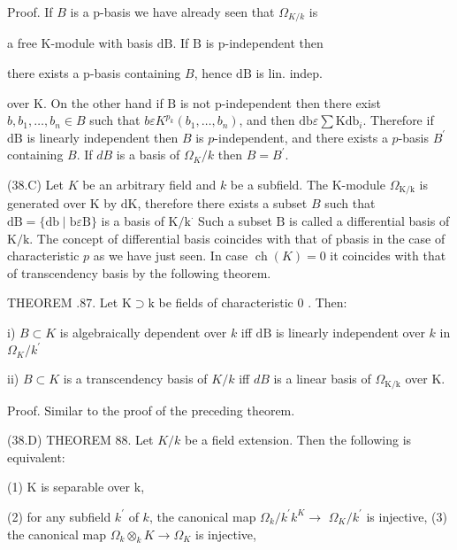 Proof. If $B$ is a p-basis we have already seen that $\Omega_{K / k}$ is

a free $\mathrm{K}$-module with basis $\mathrm{dB}$. If $\mathrm{B}$ is $\mathrm{p}$-independent then

there exists a p-basis containing $B$, hence $\mathrm{dB}$ is lin. indep.

over $\mathrm{K}$. On the other hand if $\mathrm{B}$ is not $\mathrm{p}$-independent then there exist $b, b_{1}, \ldots, b_{n} \in B$ such that $b \varepsilon K^{p_{k}}\left(b_{1}, \ldots, b_{n}\right)$, and then $\mathrm{db} \varepsilon \sum \mathrm{Kdb}_{i}$. Therefore if $\mathrm{dB}$ is linearly independent then $B$ is $p$-independent, and there exists a $p$-basis $B^{\prime}$ containing $B$. If $d B$ is a basis of $\Omega_{K} / k$ then $B=B^{\prime}$.

(38.C) Let $K$ be an arbitrary field and $k$ be a subfield. The $\mathrm{K}$-module $\Omega_{\mathrm{K} / \mathrm{k}}$ is generated over $\mathrm{K}$ by $\mathrm{dK}$, therefore there exists a subset $B$ such that $\mathrm{dB}=\{\mathrm{db} \mid \mathrm{b} \varepsilon \mathrm{B}\}$ is a basis of $\mathrm{K} / \mathrm{k}^{\cdot}$ Such a subset $\mathrm{B}$ is called a differential basis of $\mathrm{K} / \mathrm{k}$. The concept of differential basis coincides with that of pbasis in the case of characteristic $p$ as we have just seen. In case $\operatorname{ch}(K)=0$ it coincides with that of transcendency basis by the following theorem.

THEOREM .87. Let $\mathrm{K} \supset \mathrm{k}$ be fields of characteristic 0 . Then:

i) $B \subset K$ is algebraically dependent over $k$ iff $\mathrm{dB}$ is linearly independent over $k$ in $\Omega_{K} / k^{\prime}$

ii) $B \subset K$ is a transcendency basis of $K / k$ iff $d B$ is a linear basis of $\Omega_{\mathrm{K} / \mathrm{k}}$ over $\mathrm{K}$.

Proof. Similar to the proof of the preceding theorem.

(38.D) THEOREM 88. Let $K / k$ be a field extension. Then the following is equivalent:

(1) $\mathrm{K}$ is separable over $\mathrm{k}$,

(2) for any subfield $k^{\prime}$ of $k$, the canonical map $\Omega_{k} / k^{\prime} k^{K} \rightarrow$ $\Omega_{K} / k^{\prime}$ is injective, (3) the canonical map $\Omega_{k} \otimes_{k} K \rightarrow \Omega_{K}$ is injective,

